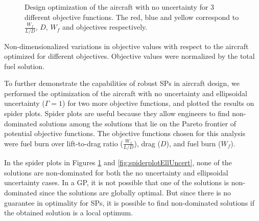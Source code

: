 \begin{figure}
\begin{center}
\end{center}
\caption[Deterministic Spider Plot]{Design optimization of the aircraft with no uncertainty for 3 different objective functions.
The red, blue and yellow correspond to $\frac{W_f}{L/D}$, $D$, $W_f$ and objectives respectively.}
\label{fig:spiderplotnoUncert}
\end{figure}


\begin{table}
\caption{Non-dimensionalized variations in objective values with respect to the aircraft optimized
for different objectives. Objective values were normalized by the total fuel solution.}
\end{table}

To further demonstrate the capabilities of robust SPs in aircraft design,
we performed the optimization of the aircraft with no uncertainty and ellipsoidal uncertainty ($\Gamma = 1$)
for two more objective functions, and plotted the results on spider plots.
Spider plots are useful because they allow engineers to find non-dominated solutions among the solutions
that lie on the Pareto frontier of potential objective functions. The objective functions chosen
for this analysis were fuel burn over lift-to-drag ratio ($\frac{W_f}{L/D}$), drag ($D$), and fuel burn ($W_f$).

In the spider plots in Figures \ref{fig:spiderplotnoUncert} and \ref{fig:spiderplotEllUncert},
none of the solutions are non-dominated for both the no uncertainty and ellipsoidal uncertainty cases.
In a GP, it is not possible that one of the solutions is non-dominated since the solutions are globally optimal.
But since there is no guarantee in optimality for SPs, it is possible to find non-dominated solutions if
the obtained solution is a local optimum.

